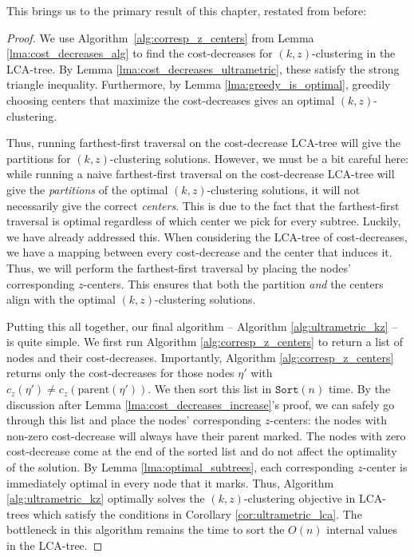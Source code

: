 \noindent This brings us to the primary result of this chapter, restated from before:
\kzclusteringtheorem*

\begin{proof}

    We use Algorithm~\ref{alg:corresp_z_centers} from Lemma \ref{lma:cost_decreases_alg} to find the cost-decreases for $(k, z)$-clustering in the LCA-tree.
    By Lemma \ref{lma:cost_decreases_ultrametric}, these satisfy the strong triangle inequality. Furthermore, by Lemma \ref{lma:greedy_is_optimal}, greedily
    choosing centers that maximize the cost-decreases gives an optimal $(k, z)$-clustering. 

    Thus, running farthest-first traversal on the cost-decrease LCA-tree will give the partitions for $(k, z)$-clustering solutions. However, we must be a bit
    careful here: while running a naive farthest-first traversal on the cost-decrease LCA-tree will give the \emph{partitions} of the optimal $(k,
    z)$-clustering solutions, it will not necessarily give the correct \emph{centers}. This is due to the fact that the farthest-first traversal is optimal
    regardless of which center we pick for every subtree. Luckily, we have already addressed this. When considering the LCA-tree of cost-decreases, we have
    a mapping between every cost-decrease and the center that induces it. Thus, we will perform the farthest-first traversal by placing the nodes'
    corresponding $z$-centers. This ensures that both the partition \emph{and} the centers align with the optimal $(k, z)$-clustering solutions.

    Putting this all together, our final algorithm -- Algorithm \ref{alg:ultrametric_kz} -- is quite simple. We first run Algorithm \ref{alg:corresp_z_centers}
    to return a list of nodes and their cost-decreases.  Importantly, Algorithm \ref{alg:corresp_z_centers} returns only the cost-decreases for those nodes
    $\eta'$ with $c_z(\eta') \neq c_z(\text{parent}(\eta'))$.  We then sort this list in $\texttt{Sort}(n)$ time. By the discussion after Lemma
    \ref{lma:cost_decreases_increase}'s proof, we can safely go through this list and place the nodes' corresponding $z$-centers: the nodes with non-zero
    cost-decrease will always have their parent marked. The nodes with zero cost-decrease come at the end of the sorted list and do not affect the optimality of
    the solution. By Lemma \ref{lma:optimal_subtrees}, each corresponding $z$-center is immediately optimal in every node that it marks. Thus, Algorithm
    \ref{alg:ultrametric_kz} optimally solves the $(k, z)$-clustering objective in LCA-trees which satisfy the conditions in Corollary
    \ref{cor:ultrametric_lca}. The bottleneck in this algorithm remains the time to sort the $O(n)$ internal values in the LCA-tree.
    

\end{proof}

